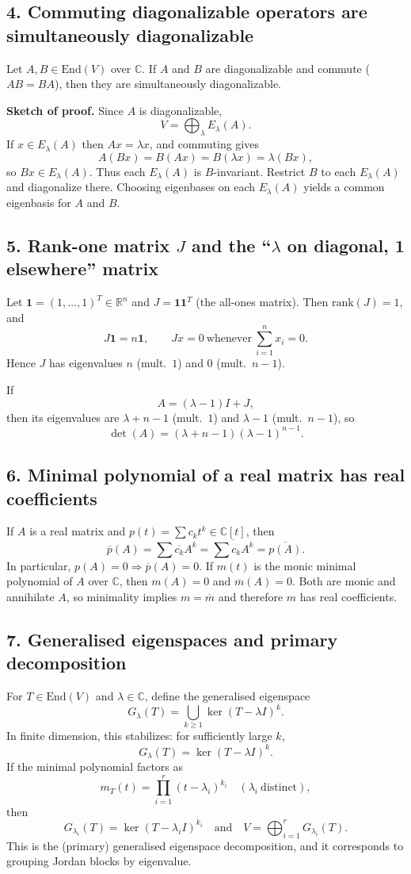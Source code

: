 \documentclass[12pt,a4paper]{article}
\theoremstyle{plain}
\theoremstyle{definition}      %
\begin{document}
\subsection*{4. Commuting diagonalizable operators are simultaneously diagonalizable}
Let $A,B\in\mathrm{End}(V)$ over $\mathbb C$.
If $A$ and $B$ are diagonalizable and commute ($AB=BA$), then they are simultaneously diagonalizable.

\textbf{Sketch of proof.}
Since $A$ is diagonalizable,
\[
V=\bigoplus_{\lambda} E_\lambda(A).
\]
If $x\in E_\lambda(A)$ then $Ax=\lambda x$, and commuting gives
\[
A(Bx)=B(Ax)=B(\lambda x)=\lambda(Bx),
\]
so $Bx\in E_\lambda(A)$. Thus each $E_\lambda(A)$ is $B$-invariant.
Restrict $B$ to each $E_\lambda(A)$ and diagonalize there.
Choosing eigenbases on each $E_\lambda(A)$ yields a common eigenbasis for $A$ and $B$.

\subsection*{5. Rank-one matrix $J$ and the ``$\lambda$ on diagonal, 1 elsewhere'' matrix}
Let $\mathbf 1=(1,\dots,1)^T\in\mathbb R^n$ and $J=\mathbf 1\mathbf 1^T$ (the all-ones matrix).
Then $\mathrm{rank}(J)=1$, and
\[
J\mathbf 1=n\mathbf 1,\qquad
Jx=0 \ \text{whenever}\ \sum_{i=1}^n x_i=0.
\]
Hence $J$ has eigenvalues $n$ (mult.\ $1$) and $0$ (mult.\ $n-1$).

If
\[
A=(\lambda-1)I+J,
\]
then its eigenvalues are $\lambda+n-1$ (mult.\ $1$) and $\lambda-1$ (mult.\ $n-1$), so
\[
\det(A)=(\lambda+n-1)(\lambda-1)^{n-1}.
\]

\subsection*{6. Minimal polynomial of a real matrix has real coefficients}
If $A$ is a real matrix and $p(t)=\sum c_k t^k\in\mathbb C[t]$, then
\[
\overline{p}(A)=\sum \overline{c_k}A^k=\overline{\sum c_kA^k}=\overline{p(A)}.
\]
In particular, $p(A)=0\Rightarrow \overline{p}(A)=0$.
If $m(t)$ is the monic minimal polynomial of $A$ over $\mathbb C$, then $m(A)=0$ and $\overline m(A)=0$.
Both are monic and annihilate $A$, so minimality implies $m=\overline m$ and therefore $m$ has real coefficients.

\subsection*{7. Generalised eigenspaces and primary decomposition}
For $T\in\mathrm{End}(V)$ and $\lambda\in\mathbb C$, define the generalised eigenspace
\[
G_\lambda(T)=\bigcup_{k\ge 1}\ker(T-\lambda I)^k.
\]
In finite dimension, this stabilizes: for sufficiently large $k$,
\[
G_\lambda(T)=\ker(T-\lambda I)^k.
\]
If the minimal polynomial factors as
\[
m_T(t)=\prod_{i=1}^r (t-\lambda_i)^{k_i}
\quad(\lambda_i\ \text{distinct}),
\]
then
\[
G_{\lambda_i}(T)=\ker(T-\lambda_i I)^{k_i}
\quad\text{and}\quad
V=\bigoplus_{i=1}^r G_{\lambda_i}(T).
\]
This is the (primary) generalised eigenspace decomposition, and it corresponds to grouping Jordan blocks by eigenvalue.
\end{document}
